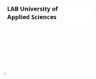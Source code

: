 \makeatletter
\begin{titlepage}
  \begin{flushleft}
    \includegraphics[width=47mm]{logos/lab.png}
    \vspace{87mm}
    \begin{spacing}{2.1}
      {\huge{\textbf \@title}} \\
      {\Large{\textbf \@subtitle}} \\
    \end{spacing}
    \vspace*{\fill}
    \begin{flushbottom}
      \@university \\
      \@degree, \@fieldofstudy \\
      \@date \\
      \@author \\
    \end{flushbottom}
  \end{flushleft}
\end{titlepage}
\makeatother
\setcounter{page}{2}
